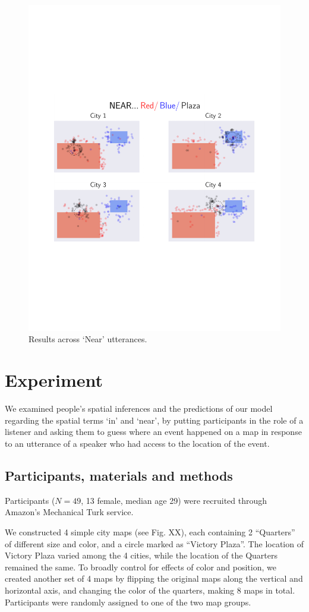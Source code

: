 \documentclass[10pt,letterpaper]{article}
\begin{document}
\begin{figure}[!]
\center
\includegraphics[width=.82\textwidth]{figures/Near.pdf}
\caption{Results across `Near' utterances.}
\label{fig:Near}
\end{figure}

\section{Experiment}\label{sec:exps}

We examined people's spatial inferences and the predictions of our model regarding the spatial terms `in' and `near', by putting participants in the role of a listener and asking them to guess where an event happened on a map in response to an utterance of a speaker who had access to the location of the event. 

\subsection{Participants, materials and methods}

Participants ($N=49$, 13 female, median age 29) were recruited through Amazon's Mechanical Turk service. 

We constructed 4 simple city maps (see Fig. XX), each containing 2 ``Quarters'' of different size and color, and a circle marked as ``Victory Plaza''. The location of Victory Plaza varied among the 4 cities, while the location of the Quarters remained the same. To broadly control for effects of color and position, we created another set of 4 maps by flipping the original maps along the vertical and horizontal axis, and changing the color of the quarters, making 8 maps in total. Participants were randomly assigned to one of the two map groups. 
\end{document}
